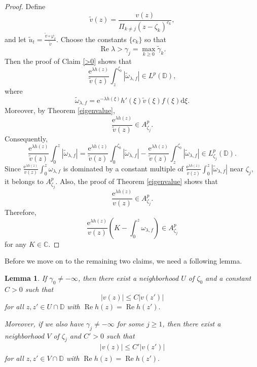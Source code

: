 \documentclass{amsart}
\theoremstyle{proclaim}
\newtheorem{lemma}[theorem]{Lemma}
\theoremstyle{fancyproclaim}
\theoremstyle{definition}
\theoremstyle{fancystatement}
\numberwithin{equation}{section}
\begin{document}
\begin{proof}
Define 
$$\tilde{v}(z)=\frac{v(z)}{\Pi_{k\ne j}(z-\zeta_k)^{c_k}},$$ 
and let $\tilde{u}_t=\frac{\tilde{v}\circ\varphi_t}{\tilde{v}}.$ Choose the constants $\{c_k\}$ so that 
$$\operatorname{Re}\lambda>\gamma_j=\max_{k\geq0}\tilde{\gamma}_k.$$ 
Then the proof of Claim \ref{>0} shows that 
$$\frac{ \mathrm{e}^{\lambda h(z)}}{\tilde{v}(z)}\int_z^{\zeta_0}|\tilde{\omega}_{\lambda,f}|\in L^p(\mathbb{D}),$$
where
$$\tilde{\omega}_{\lambda,f}=\mathrm{e}^{-\lambda h(\xi)}h'(\xi)\tilde{v}(\xi)f(\xi) \mathrm{d}\xi.$$
Moreover, by Theorem \ref{eigenvalue}, 
$$\frac{ \mathrm{e}^{\lambda h(z)}}{\tilde{v}(z)}\in A^p_{\zeta_j}.$$
Consequently,
$$\frac{ \mathrm{e}^{\lambda h(z)}}{\tilde{v}(z)}\int_0^z|\tilde{\omega}_{\lambda,f}|=\frac{ \mathrm{e}^{\lambda h(z)}}{\tilde{v}(z)}\int_0^{\zeta_0}|\tilde{\omega}_{\lambda,f}|-\frac{ \mathrm{e}^{\lambda h(z)}}{\tilde{v}(z)}\int_z^{\zeta_0}|\tilde{\omega}_{\lambda,f}|\in L^p_{\zeta_j}(\mathbb{D}).$$ 
Since $\frac{ \mathrm{e}^{\lambda h(z)}}{v(z)}\int_0^{z}\omega_{\lambda,f}$ is dominated by a constant multiple of $\frac{ \mathrm{e}^{\lambda h(z)}}{\tilde{v}(z)}\int_0^z|\tilde{\omega}_{\lambda,f}|$ near $\zeta_j$, it belongs to $A^p_{\zeta_j}.$ Also, the proof of Theorem \ref{eigenvalue} shows that 
$$\frac{ \mathrm{e}^{\lambda h(z)}}{v(z)}\in A^p_{\zeta_j}.$$ 
Therefore, 
$$\frac{ \mathrm{e}^{\lambda h(z)}}{v(z)}\left(K-\int_0^{z}\omega_{\lambda,f}\right)\in A^p_{\zeta_j}$$
for any $K\in\mathbb{C}$. 
\end{proof}







Before we move on to the remaining two claims, we need a following lemma.

\begin{lemma}\label{lastlemma}
If $\gamma_0\ne-\infty$, then there exist a neighborhood $U$ of $\zeta_0$ and a constant $C>0$ such that
$$ |v(z)|\leq C |v(z')|$$
for all $z, z'\in U\cap\mathbb{D}$ with $ \operatorname{Re}h(z)= \operatorname{Re}h(z').$ 

Moreover, if we also have $\gamma_j\ne -\infty$ for some $j\geq 1$, then there exist a neighborhood $V$ of $\zeta_j$ and $C'>0$ such that
\begin{align}\label{zongxiang}
 |v(z)|\leq C'|v(z')|
\end{align}
for all $z, z'\in V\cap\mathbb{D}$ with $ \operatorname{Re}h(z)= \operatorname{Re}h(z').$ 
\end{lemma}
\end{document}

